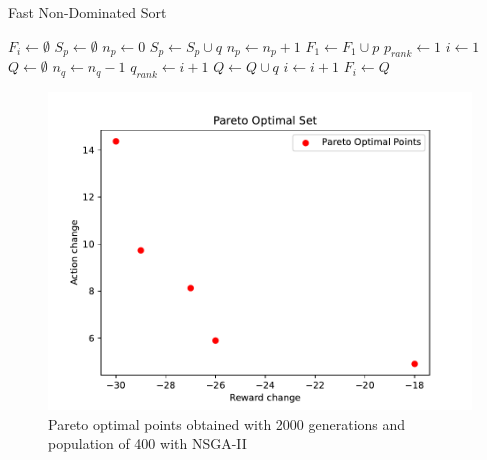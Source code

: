 \documentclass[UKenglish]{uiomasterthesis}
\begin{document}
\begin{algorithm}
\caption{Fast Non-Dominated Sort}
\label{alg:fnds}
\begin{algorithmic}
    \State $F_i \gets \emptyset$
    \State $S_p \gets \emptyset$
    \State $n_p \gets 0$
                \State $S_p \gets S_p \cup q$
                \State $n_p \gets n_p + 1$
            \EndIf
        \EndFor
            \State $F_1 \gets F_1 \cup p$
            \State $p_{rank} \gets 1$
        \EndIf
    \EndFor
    \State $i \gets 1$
        \State $Q \gets \emptyset$
                \State $n_q \gets n_q - 1$
                    \State $q_{rank} \gets i + 1$
                    \State $Q \gets Q \cup q$
                \EndIf
            \EndFor
        \EndFor
        \State $i \gets i + 1$
        \State $F_i \gets Q$
    \EndWhile
\end{algorithmic}
\end{algorithm}


\begin{figure}[!ht]
	\includegraphics[width=\columnwidth]{images/best_counterfactuals.pdf}
	\caption{Pareto optimal points obtained with 2000 generations and population of 400 with NSGA-II}
	\label{fig:pareto} 
\end{figure}
\end{document}
